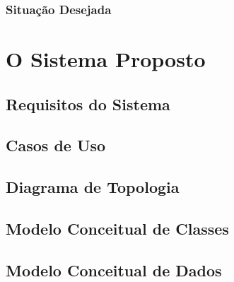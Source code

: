 \documentclass[a4paper]{abntex2}
\begin{document}
\subsection{Situação Desejada}

\chapter{O Sistema Proposto}

\section{Requisitos do Sistema}

\pagebreak
\section{Casos de Uso}

\section{Diagrama de Topologia}

\section{Modelo Conceitual de Classes}

\section{Modelo Conceitual de Dados}

\printbibliography
\end{document}
